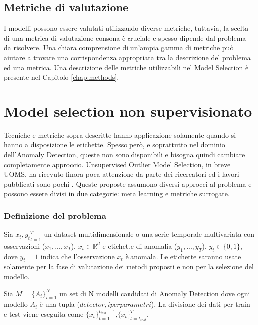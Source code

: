 \subsection{Metriche di valutazione}
I modelli possono essere valutati utilizzando diverse metriche, tuttavia, la scelta di una metrica di valutazione consona è cruciale e spesso dipende dal problema da risolvere. Una chiara comprensione di un'ampia gamma di metriche può aiutare a trovare una corrispondenza appropriata tra la descrizione del problema ed una metrica.
Una descrizione delle metriche utilizzabili nel Model Selection è presente nel Capitolo \ref{chap:methods}.

\section{Model selection non supervisionato}
Tecniche e metriche sopra descritte hanno applicazione solamente quando si hanno a disposizione le etichette. Spesso però, e soprattutto nel dominio dell'Anomaly Detection, queste non sono disponibili e bisogna quindi cambiare completamente approccio. 
Unsupervised Outlier Model Selection, in breve UOMS, ha ricevuto finora poca attenzione da parte dei ricercatori ed i lavori pubblicati sono pochi  \cite{https://doi.org/10.48550/arxiv.2211.01834, https://doi.org/10.48550/arxiv.2210.01078, clei2022n,https://doi.org/10.48550/arxiv.1212.0960, https://doi.org/10.48550/arxiv.2009.10606, https://doi.org/10.48550/arxiv.2104.01422}. Queste proposte assumono diversi approcci al problema e possono essere divisi in due categorie: meta learning e metriche surrogate.

\subsubsection{Definizione del problema}
Sia \({x_t,y_t}^T_{t=1}\) un dataset multidimensionale o una serie temporale multivariata con osservazioni (\(x_1,...,x_T\)), \(x_t\in\mathbb{R}^d\) e etichette di anomalia (\(y_1,...,y_T\)), \(y_t \in \{0,1\}\), dove \(y_t=1\) indica che l'osservazione \(x_t\) è anomala. Le etichette saranno usate solamente per la fase di valutazione dei metodi proposti e non per la selezione del modello.

Sia \(M=\{A_i\}^N_{i=1}\) un set di N modelli candidati di Anomaly Detection dove ogni modello \(A_i\) è una tupla (\(detector, iperparametri\)).
La divisione dei dati per train e test viene eseguita come \(\{x_t\}_{t=1}^{t_{test}-1}\),\(\{x_t\}^{T}_{t=t_{test}}\).

